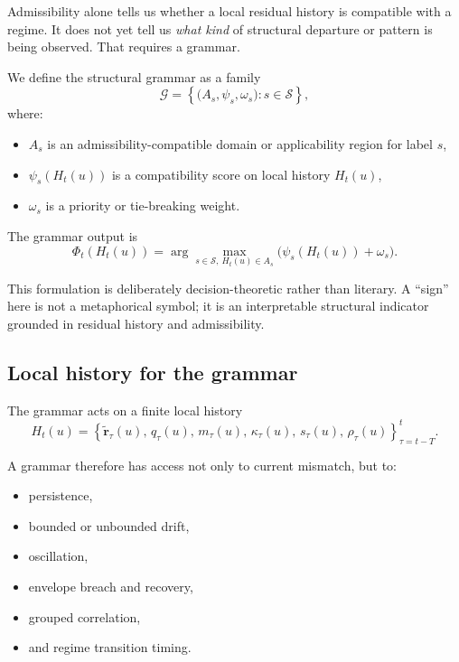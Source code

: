 \documentclass[11pt,letterpaper]{article}
\theoremstyle{gcresult}
\theoremstyle{definition}
\begin{document}
Admissibility alone tells us whether a local residual history is compatible with a regime. It does not yet tell us \emph{what kind} of structural departure or pattern is being observed. That requires a grammar.

We define the structural grammar as a family
\begin{equation}
\mathcal G=
\left\{
\bigl(A_s,\psi_s,\omega_s\bigr): s\in\mathcal S
\right\},
\end{equation}
where:
\begin{itemize}[leftmargin=1.5em]
    \item $A_s$ is an admissibility-compatible domain or applicability region for label $s$,
    \item $\psi_s(H_t(u))$ is a compatibility score on local history $H_t(u)$,
    \item $\omega_s$ is a priority or tie-breaking weight.
\end{itemize}

The grammar output is
\begin{equation}
\Phi_t(H_t(u))=
\arg\max_{s\in\mathcal S,\ H_t(u)\in A_s}
\bigl(\psi_s(H_t(u))+\omega_s\bigr).
\end{equation}

This formulation is deliberately decision-theoretic rather than literary. A “sign” here is not a metaphorical symbol; it is an interpretable structural indicator grounded in residual history and admissibility.


\subsection{Local history for the grammar}

The grammar acts on a finite local history
\begin{equation}
H_t(u)=
\left\{
\tilde{\mathbf r}_\tau(u),\,
q_\tau(u),\,
m_\tau(u),\,
\kappa_\tau(u),\,
s_\tau(u),\,
\rho_\tau(u)
\right\}_{\tau=t-T}^{t}.
\end{equation}

A grammar therefore has access not only to current mismatch, but to:
\begin{itemize}[leftmargin=1.5em]
    \item persistence,
    \item bounded or unbounded drift,
    \item oscillation,
    \item envelope breach and recovery,
    \item grouped correlation,
    \item and regime transition timing.
\end{itemize}
\end{document}
